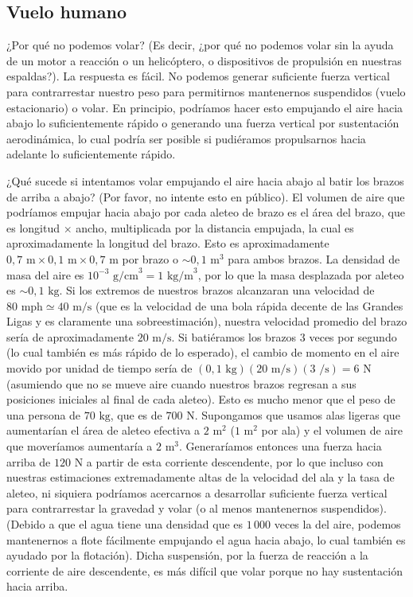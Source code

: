 \documentclass[12pt]{book}
\begin{document}
\subsection{Vuelo humano}

¿Por qué no podemos volar? (Es decir, ¿por qué no podemos volar sin la ayuda de un motor a reacción o un helicóptero, o dispositivos de propulsión en nuestras espaldas?). La respuesta es fácil. No podemos generar suficiente fuerza vertical para contrarrestar nuestro peso para permitirnos mantenernos suspendidos (vuelo estacionario) o volar. En principio, podríamos hacer esto empujando el aire hacia abajo lo suficientemente rápido o generando una fuerza vertical por sustentación aerodinámica, lo cual podría ser posible si pudiéramos propulsarnos hacia adelante lo suficientemente rápido.

¿Qué sucede si intentamos volar empujando el aire hacia abajo al batir los brazos de arriba a abajo? (Por favor, no intente esto en público). El volumen de aire que podríamos empujar hacia abajo por cada aleteo de brazo es el área del brazo, que es longitud $\times$ ancho, multiplicada por la distancia empujada, la cual es aproximadamente la longitud del brazo. Esto es aproximadamente $0{,}7\text{ m} \times 0{,}1\text{ m} \times 0{,}7\text{ m}$ por brazo o ${\sim}0{,}1\text{ m}^3$ para ambos brazos. La densidad de masa del aire es $10^{-3}\text{ g/cm}^3 = 1\text{ kg/m}^3$, por lo que la masa desplazada por aleteo es ${\sim}0{,}1\text{ kg}$. Si los extremos de nuestros brazos alcanzaran una velocidad de $80\text{ mph} \simeq 40\text{ m/s}$ (que es la velocidad de una bola rápida decente de las Grandes Ligas y es claramente una sobreestimación), nuestra velocidad promedio del brazo sería de aproximadamente $20\text{ m/s}$. Si batiéramos los brazos $3$ veces por segundo (lo cual también es más rápido de lo esperado), el cambio de momento en el aire movido por unidad de tiempo sería de $(0{,}1\text{ kg})(20\text{ m/s})(3\text{ /s}) = 6\text{ N}$ (asumiendo que no se mueve aire cuando nuestros brazos regresan a sus posiciones iniciales al final de cada aleteo). Esto es mucho menor que el peso de una persona de $70\text{ kg}$, que es de $700\text{ N}$. Supongamos que usamos alas ligeras que aumentarían el área de aleteo efectiva a $2\text{ m}^2$ ($1\text{ m}^2$ por ala) y el volumen de aire que moveríamos aumentaría a $2\text{ m}^3$. Generaríamos entonces una fuerza hacia arriba de $120\text{ N}$ a partir de esta corriente descendente, por lo que incluso con nuestras estimaciones extremadamente altas de la velocidad del ala y la tasa de aleteo, ni siquiera podríamos acercarnos a desarrollar suficiente fuerza vertical para contrarrestar la gravedad y volar (o al menos mantenernos suspendidos). (Debido a que el agua tiene una densidad que es $1\,000$ veces la del aire, podemos mantenernos a flote fácilmente empujando el agua hacia abajo, lo cual también es ayudado por la flotación). Dicha suspensión, por la fuerza de reacción a la corriente de aire descendente, es más difícil que volar porque no hay sustentación hacia arriba.
\end{document}
